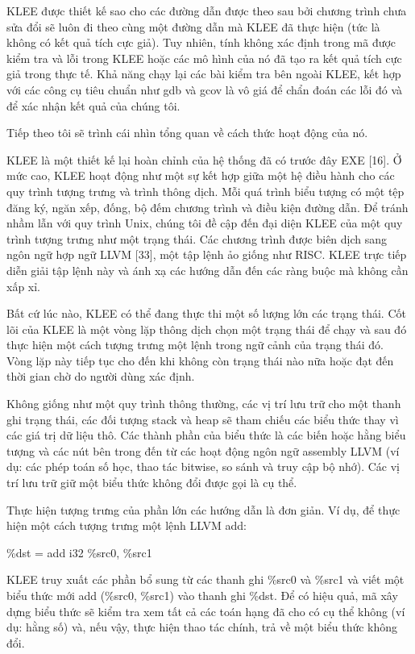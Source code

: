 \documentclass[12pt,a4paper]{article}
\begin{document}
\indent KLEE được thiết kế sao cho các đường dẫn được theo sau bởi chương trình chưa sửa đổi sẽ luôn đi theo cùng một đường dẫn mà KLEE đã thực hiện (tức là không có kết quả tích cực giả). Tuy nhiên, tính không xác định trong mã được kiểm tra và lỗi trong KLEE hoặc các mô hình của nó đã tạo ra kết quả tích cực giả trong thực tế. Khả năng chạy lại các bài kiểm tra bên ngoài KLEE, kết hợp với các công cụ tiêu chuẩn như gdb và gcov là vô giá để chẩn đoán các lỗi đó và để xác nhận kết quả của chúng tôi.

\indent Tiếp theo tôi sẽ trình cái nhìn tổng quan về cách thức hoạt động của nó.

\indent KLEE là một thiết kế lại hoàn chỉnh của hệ thống đã có trước đây EXE [16]. Ở mức cao, KLEE hoạt động như một sự kết hợp giữa một hệ điều hành cho các quy trình tượng trưng và trình thông dịch. Mỗi quá trình biểu tượng có một tệp đăng ký, ngăn xếp, đống, bộ đếm chương trình và điều kiện đường dẫn. Để tránh nhầm lẫn với quy trình Unix, chúng tôi đề cập đến đại diện KLEE của một quy trình tượng trưng như một trạng thái. Các chương trình được biên dịch sang ngôn ngữ hợp ngữ LLVM [33], một tập lệnh ảo giống như RISC. KLEE trực tiếp diễn giải tập lệnh này và ánh xạ các hướng dẫn đến các ràng buộc mà không cần xấp xỉ.

\indent Bất cứ lúc nào, KLEE có thể đang thực thi một số lượng lớn các trạng thái. Cốt lõi của KLEE là một vòng lặp thông dịch chọn một trạng thái để chạy và sau đó thực hiện một cách tượng trưng một lệnh trong ngữ cảnh của trạng thái đó. Vòng lặp này tiếp tục cho đến khi không còn trạng thái nào nữa hoặc đạt đến thời gian chờ do người dùng xác định.

\indent Không giống như một quy trình thông thường, các vị trí lưu trữ cho một thanh ghi trạng thái, các đối tượng stack và heap sẽ tham chiếu các biểu thức  thay vì các giá trị dữ liệu thô. Các thành phần của biểu thức là các biến hoặc hằng biểu tượng và các nút bên trong đến từ các hoạt động ngôn ngữ assembly LLVM (ví dụ: các phép toán số học, thao tác bitwise, so sánh và truy cập bộ nhớ). Các vị trí lưu trữ giữ một biểu thức không đổi được gọi là cụ thể.

\indent Thực hiện tượng trưng của phần lớn các hướng dẫn là đơn giản. Ví dụ, để thực hiện một cách tượng trưng một lệnh LLVM add:

\begin{center}
\%dst = add i32 \%src0, \%src1
\end{center}

\indent KLEE truy xuất các phần bổ sung từ các thanh ghi \%src0 và \%src1 và viết một biểu thức mới add (\%src0, \%src1) vào thanh ghi \%dst. Để có hiệu quả, mã xây dựng biểu thức sẽ kiểm tra xem tất cả các toán hạng đã cho có cụ thể không (ví dụ: hằng số) và, nếu vậy, thực hiện thao tác chính, trả về một biểu thức không đổi.
\end{document}
